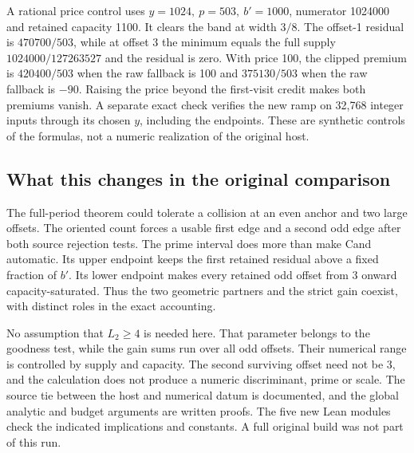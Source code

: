\documentclass[12pt,letterpaper]{article}
\DeclareRobustCommand{\id}[1]{\mbox{\small\ttfamily #1}}
\begin{document}
A rational price control uses \(y=1024,\ p=503,\ b'=1000\), numerator 1024000 and retained capacity 1100. It clears the band at width \(3/8\). The offset-1 residual is \(470700/503\), while at offset 3 the minimum equals the full supply \(1024000/127263527\) and the residual is zero. With price 100, the clipped premium is \(420400/503\) when the raw fallback is 100 and \(375130/503\) when the raw fallback is \(-90\). Raising the price beyond the first-visit credit makes both premiums vanish. A separate exact check verifies the new ramp on 32,768 integer inputs through its chosen \(y\), including the endpoints. These are synthetic controls of the formulas, not a numeric realization of the original host.

\subsection{What this changes in the original comparison}

The full-period theorem could tolerate a collision at an even anchor and two large offsets. The oriented count forces a usable first edge and a second odd edge after both source rejection tests. The prime interval does more than make \id{Cand} automatic. Its upper endpoint keeps the first retained residual above a fixed fraction of \(b'\). Its lower endpoint makes every retained odd offset from 3 onward capacity-saturated. Thus the two geometric partners and the strict gain coexist, with distinct roles in the exact accounting.

No assumption that \(L_2\ge4\) is needed here. That parameter belongs to the goodness test, while the gain sums run over all odd offsets. Their numerical range is controlled by supply and capacity. The second surviving offset need not be 3, and the calculation does not produce a numeric discriminant, prime or scale. The source tie between the host and numerical datum is documented, and the global analytic and budget arguments are written proofs. The five new Lean modules check the indicated implications and constants. A full original build was not part of this run.
\end{document}
